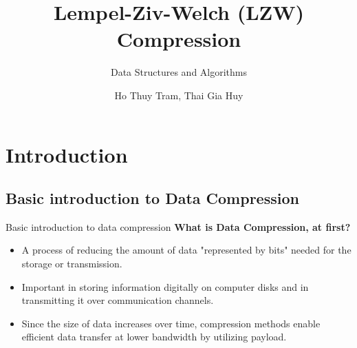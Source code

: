 \documentclass[10pt,handout,english]{beamer}
\author{Ho Thuy Tram, Thai Gia Huy}
\title{Lempel-Ziv-Welch (LZW) Compression}
\subtitle{Data Structures and Algorithms}
\institute{University of Science - VNU HCMC}
\date{\empty}
\begin{document}
\setmainfont{Times New Roman}
\begin{frame}
    
    
    
    \titlepage
\end{frame}

\begin{frame}
    \tableofcontents[sectionstyle=show,subsectionstyle=show/shaded/hide,subsubsectionstyle=show/shaded/hide]
\end{frame}

\section{Introduction}
\subsection{Basic introduction to Data Compression }
\begin{frame}{Basic introduction to data compression}
    \textbf{\large{What is Data Compression, at first?}}
    
    \vspace{0.5pt}
    
    \begin{itemize} [label=\textcolor{purple}{$\bullet$}]
        \item  A process of reducing the amount of data "represented by bits" needed for the storage or transmission.
        \vspace{0.2pt}
        \item Important in storing information digitally on computer disks and in transmitting it over communication channels.
        \vspace{0.2pt}
        \item Since the size of data increases over time, compression methods enable efficient data transfer at lower bandwidth by utilizing payload.
    \end{itemize}
\end{frame}
\end{document}
